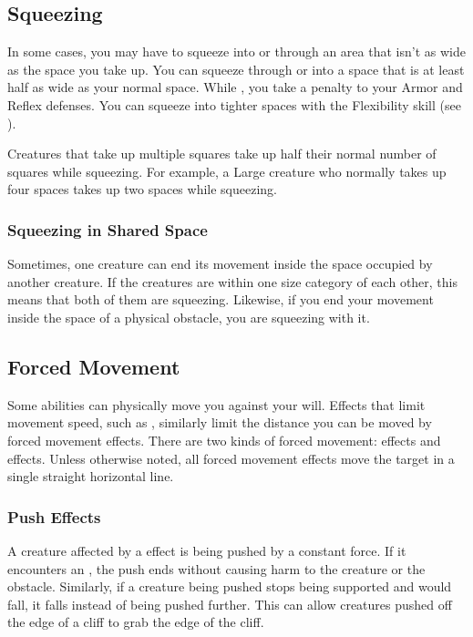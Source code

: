  \subsection{Squeezing}\label{Squeezing}
    In some cases, you may have to squeeze into or through an area that isn't as wide as the space you take up.
    You can squeeze through or into a space that is at least half as wide as your normal space.
    While \squeezing, you take a  penalty to your Armor and Reflex defenses.
    You can squeeze into tighter spaces with the Flexibility skill (see ).

    Creatures that take up multiple squares take up half their normal number of squares while squeezing.
    For example, a Large creature who normally takes up four spaces takes up two spaces while squeezing.

    \subsubsection{Squeezing in Shared Space}
      Sometimes, one creature can end its movement inside the space occupied by another creature.
      If the creatures are within one size category of each other, this means that both of them are squeezing.
      Likewise, if you end your movement inside the space of a physical obstacle, you are squeezing with it.

  \subsection{Forced Movement}\label{Forced Movement}
    Some abilities can physically move you against your will.
    Effects that limit movement speed, such as , similarly limit the distance you can be moved by forced movement effects.
    There are two kinds of forced movement:  effects and  effects.
    Unless otherwise noted, all forced movement effects move the target in a single straight horizontal line.

    \subsubsection{Push Effects}\label{Push Effects}
      A creature affected by a  effect is being pushed by a constant force.
      If it encounters an , the push ends without causing harm to the creature or the obstacle.
      Similarly, if a creature being pushed stops being supported and would fall, it falls instead of being pushed further.
      This can allow creatures pushed off the edge of a cliff to grab the edge of the cliff.

